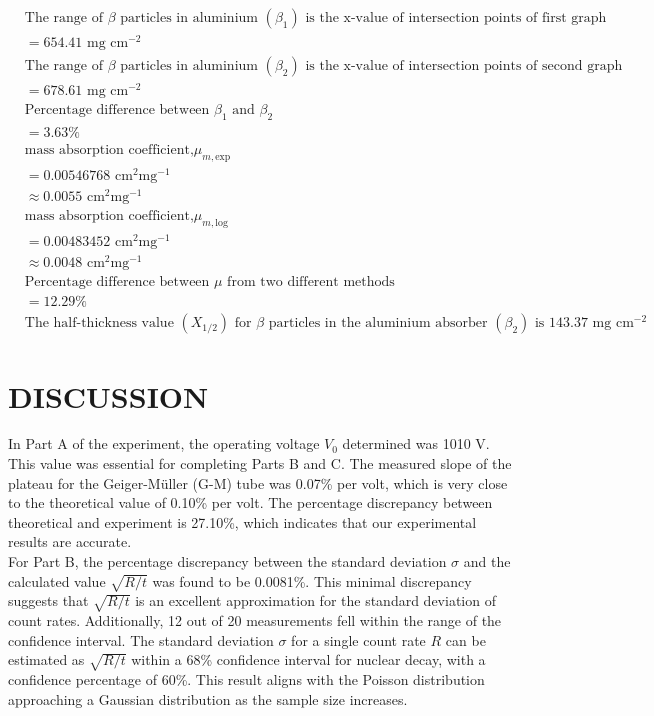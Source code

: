 \documentclass[a4paper,11pt]{article}
\begin{document}
\begin{align*}
&\text{The range of }\beta\text{ particles in aluminium } (\beta_1)  \text{ is the x-value of intersection points of first graph }\\
&= 654.41 \text{ mg {cm}$^{-2}$} \\
&\text{The range of }\beta\text{ particles in aluminium } (\beta_2)  \text{ is the x-value of intersection points of second graph} \\
&= 678.61 \text{ mg {cm}$^{-2}$} \\
&\text{Percentage difference between } \beta_1 \text{ and } \beta_2 \\
& = 3.63\% \\
&\text{mass absorption coefficient,} \mu_{m, \text{exp}}  \\
&= 0.00546768 \text{ cm}^2\text{mg$^{-1}$} \\
&\approx 0.0055 \text{ cm}^2\text{mg$^{-1}$} \\
&\text{mass absorption coefficient,} \mu_{m, \text{log}}  \\
&= 0.00483452 \text{ cm}^2\text{mg$^{-1}$} \\
&\approx 0.0048 \text{ cm}^2\text{mg$^{-1}$} \\
&\text{Percentage difference between } \mu \text{ from two different methods}  \\
&= 12.29\% \\
&\text{The half-thickness value } (X_{1/2}) \text{ for } \beta \text{ particles in the aluminium absorber } (\beta_2)  \text{ is } 143.37 \text{ mg {cm}$^{-2}$}
\end{align*}
\newpage
{}
\section*{\center DISCUSSION}
\label{sec:DISCUSSION}
\qquad In Part A of the experiment, the operating voltage \( V_0 \) determined was 1010 V. This value was essential for completing Parts B and C. The measured slope of the plateau for the Geiger-Müller (G-M) tube was 0.07\% per volt, which is very close to the theoretical value of 0.10\% per volt. The percentage discrepancy between theoretical and experiment is 27.10\%, which indicates that our experimental results are accurate.\\

For Part B, the percentage discrepancy between the standard deviation \( \sigma \) and the calculated value \( \sqrt{R/t} \) was found to be 0.0081\%. This minimal discrepancy suggests that \( \sqrt{R/t} \) is an excellent approximation for the standard deviation of count rates. Additionally, 12 out of 20 measurements fell within the range of the confidence interval. The standard deviation \( \sigma \) for a single count rate \( R \) can be estimated as \( \sqrt{R/t} \) within a 68\% confidence interval for nuclear decay, with a confidence percentage of 60\%. This result aligns with the Poisson distribution approaching a Gaussian distribution as the sample size increases.\\
\end{document}

